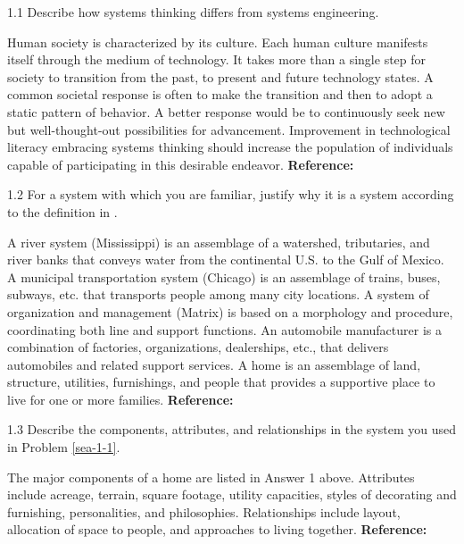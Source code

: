 \begin{exsol@exercise}{1.1}
    \label{sea-1-26}
        Describe how systems thinking differs from systems engineering.
\end{exsol@exercise}
\begin{exsol@solution}{}
        Human society is characterized by its culture. Each human culture manifests itself through the medium of technology. It takes more than a single step for society to transition from the past, to present and future technology states. A common societal response is often to make the transition and then to adopt a static pattern of behavior. A better response would be to continuously seek new but well-thought-out possibilities for advancement. Improvement in technological literacy embracing systems thinking should increase the population of individuals capable of participating in this desirable endeavor. \textbf{Reference:}
\end{exsol@solution}
\begin{exsol@exercise}{1.2}
    \label{sea-1-1}
        For a system with which you are familiar, justify why it is a system according to the definition in .
\end{exsol@exercise}
\begin{exsol@solution}{}
        A river system (Mississippi) is an assemblage of a watershed, tributaries, and river banks that conveys water from the continental U.S. to the Gulf of Mexico. A municipal transportation system (Chicago) is an assemblage of trains, buses, subways, etc. that transports people among many city locations. A system of organization and management (Matrix) is based on a morphology and procedure, coordinating both line and support functions. An automobile manufacturer is a combination of factories, organizations, dealerships, etc., that delivers automobiles and related support services. A home is an assemblage of land, structure, utilities, furnishings, and people that provides a supportive place to live for one or more families. \textbf{Reference:}
\end{exsol@solution}
\begin{exsol@exercise}{1.3}
    \label{sea-1-2}
        Describe the components, attributes, and relationships in the system you used in Problem \ref{sea-1-1}.
\end{exsol@exercise}
\begin{exsol@solution}{}
        The major components of a home are listed in Answer 1 above. Attributes include acreage, terrain, square footage, utility capacities, styles of decorating and furnishing, personalities, and philosophies. Relationships include layout, allocation of space to people, and approaches to living together. \textbf{Reference:}
\end{exsol@solution}
